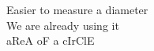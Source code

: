 \documentclass[preview]{standalone}
\begin{document}
Easier to measure a diameter\\We are already using it\\aReA oF a cIrClE\\
\end{document}
